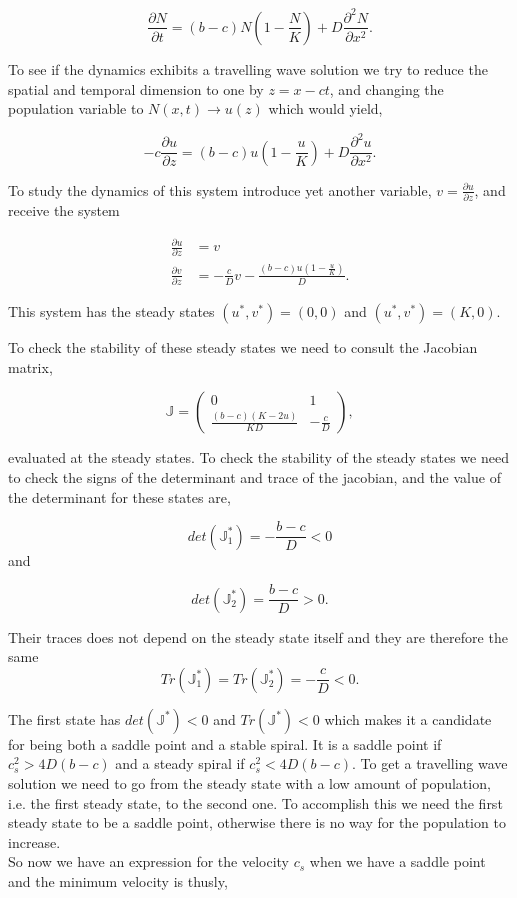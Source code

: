 \begin{equation}
\frac{\partial N}{\partial t}=(b-c)N\left(1-\frac{N}{K}\right)+D\frac{\partial^2 N}{\partial x^2}.
\end{equation}

To see if the dynamics exhibits a travelling wave solution we try to reduce the spatial and temporal dimension to one by $z=x-ct$, and changing the population variable to $N(x,t)\rightarrow u(z)$ which would yield,

\begin{equation}
-c\frac{\partial u}{\partial z}=(b-c)u\left(1-\frac{u}{K}\right)+D\frac{\partial^2 u}{\partial x^2}.
\end{equation}

To study the dynamics of this system introduce yet another variable, $v=\frac{\partial u}{\partial z}$, and receive the system 

\begin{align*}
\frac{\partial u}{\partial z}&=v\\
\frac{\partial v}{\partial z}&=-\frac{c}{D}v-\frac{(b-c)u(1-\frac{u}{K})}{D}.
\end{align*}

This system has the steady states $(u^*,v^*)=(0,0)$ and $(u^*,v^*)=(K,0)$.

To check the stability of these steady states we need to consult the Jacobian matrix,

\begin{equation}
\mathbb{J}=\left(\begin{array}{cc}
0 & 1 \\
  \frac{(b-c)(K-2u)}{KD} & -\frac{c}{D}
\end{array}\right),
\end{equation}

 evaluated at the steady states. To check the stability of the steady states we need to check the signs of the determinant and trace of the jacobian, and the value of the determinant for these states are,
 
 $$
 det(\mathbb{J}^*_1)= -\frac{b-c}{D}<0
 $$
 and
 
 $$
 det(\mathbb{J}^*_2)=\frac{b-c}{D}>0.
 $$
 
 Their traces does not depend on the steady state itself and they are therefore the same 
 $$
 Tr(\mathbb{J}^*_1)=Tr(\mathbb{J}^*_2)=-\frac{c}{D}<0.
 $$
 
The first state has $det(\mathbb{J}^*)<0$ and $Tr(\mathbb{J}^*)<0$ which makes it a candidate for being both a saddle point and a stable spiral. It is a saddle point if $c^2_s>4D(b-c)$ and a steady spiral if $c^2_s<4D(b-c)$. To get a travelling wave solution we need to go from the steady state with a low amount of population, i.e. the first steady state, to the second one. To accomplish this we need the first steady state to be a saddle point, otherwise there is no way for the population to increase.\\
So now we have an expression for the velocity $c_s$ when we have a saddle point and the minimum velocity is thusly,

